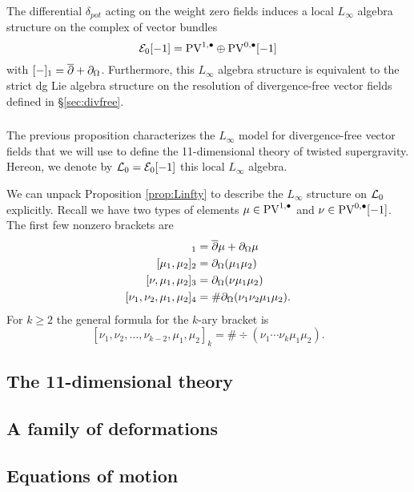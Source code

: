 \documentclass[11pt]{amsart}
\begin{document}
\begin{prop}
\label{prop:Linfty}
The differential $\delta_{pot}$ acting on the weight zero fields induces a local $L_\infty$ algebra structure on the complex of vector bundles 
\[
\mathcal E_0 [-1] = {\rm PV}^{1,\bullet} \oplus {\rm PV}^{0,\bullet}[-1]
\]
with $[-]_1 = \overline{\partial} + \partial_{\Omega}$. 
Furthermore, this $L_\infty$ algebra structure is equivalent to the strict dg Lie algebra structure on the resolution of divergence-free vector fields defined in \S \ref{sec:divfree}. 
\end{prop}

\subsubsection{}

The previous proposition characterizes the $L_\infty$ model for divergence-free vector fields that we will use to define the 11-dimensional theory of twisted supergravity. 
Hereon, we denote by $\mathcal L_0 = \mathcal E_0[-1]$ this local $L_\infty$ algebra. 

We can unpack Proposition \ref{prop:Linfty} to describe the $L_\infty$ structure on $\mathcal L_0$ explicitly. 
Recall we have two types of elements $\mu \in {\rm PV}^{1,\bullet}$ and $\nu \in {\rm PV}^{0,\bullet}[-1]$. 
The first few nonzero brackets are
\begin{align*}
[\mu]_1 & = \dbar \mu + \div \mu \\
[\mu_1,\mu_2]_2 & = \div (\mu_1 \mu_2) \\
[\nu, \mu_1,\mu_2]_3 & = \div(\nu \mu_1 \mu_2) \\
[\nu_1,\nu_2, \mu_1,\mu_2]_4 & = \# \div(\nu_1 \nu_2 \mu_1 \mu_2).
\end{align*}
For $k \geq 2$ the general formula for the $k$-ary bracket is 
\[
[\nu_1,\nu_2, \ldots, \nu_{k-2}, \mu_1,\mu_2]_{k} = \# \div(\nu_1 \cdots \nu_k \mu_1 \mu_2) .
\]


\subsection{The 11-dimensional theory}

\subsection{A family of deformations} 


\subsection{Equations of motion}
\end{document}
